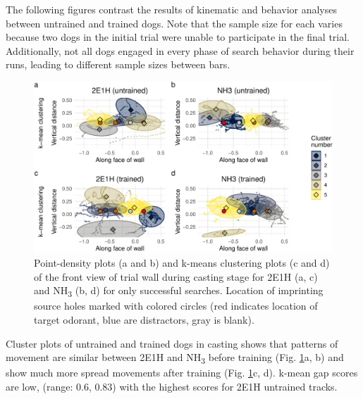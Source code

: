 \documentclass[
]{article}
\begin{document}
The following figures contrast the results of kinematic and behavior analyses between untrained and trained dogs. Note that the sample size for each varies because two dogs in the initial trial were unable to participate in the final trial. Additionally, not all dogs engaged in every phase of search behavior during their runs, leading to different sample sizes between bars.

\begin{figure}
\centering
\includegraphics{supplementary-info_files/figure-latex/frontwall-casting-training-1.pdf}
\caption{\label{fig:frontwall-casting-training}Point-density plots (a and b) and k-means clustering plots (c and d) of the front view of trial wall during casting stage for 2E1H (a, c) and NH\textsubscript{3} (b, d) for only successful searches. Location of imprinting source holes marked with colored circles (red indicates location of target odorant, blue are distractors, gray is blank).}
\end{figure}

Cluster plots of untrained and trained dogs in casting shows that patterns of movement are similar between 2E1H and NH\textsubscript{3} before training (Fig. \ref{fig:frontwall-casting-training}a, b) and show much more spread movements after training (Fig. \ref{fig:frontwall-casting-training}c, d). k-mean gap scores are low, (range: 0.6, 0.83) with the highest scores for 2E1H untrained tracks.
\end{document}
